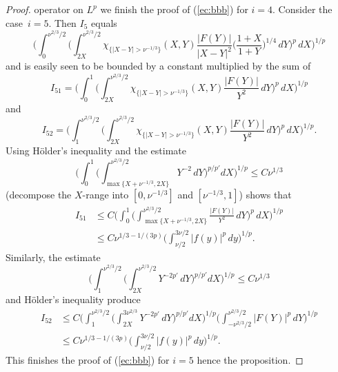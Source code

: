 \documentclass[leqno,a4paper]{amsart}
\begin{document}
\begin{proof}
operator on $L^p$ we finish the proof of (\ref{ec:bbb}) for $i=4$.
Consider the case~$i=5$. Then $I_5$ equals
\begin{equation*}
\bigg( \int_{0}^{\nu^{2/3}/2}\bigg(\int_{2X}^{\nu^{2/3}/2}
\chi_{\{|X-Y|>\nu^{-1/3}\}}(X,Y)\frac{|F(Y)|}{|X-Y|^2}
\bigg(\frac{1+X}{1+Y}\bigg)^{1/4}\,dY\bigg)^p \,dX\bigg)^{1/p}
\end{equation*}
and is easily seen to be bounded by a constant multiplied by the sum of
\begin{equation*}
I_{51}=\bigg(\int_{0}^{1}\bigg(\int_{2X}^{\nu^{2/3}/2}
\chi_{\{|X-Y|>\nu^{-1/3}\}}(X,Y)\frac{|F(Y)|}{Y^{2}}\,dY\bigg)^p\,dX\bigg)^{1/p}
\end{equation*}
and
\begin{equation*}
I_{52}=\bigg(\int_{1}^{\nu^{2/3}/2}\bigg(\int_{2X}^{\nu^{2/3}/2}
\chi_{\{|X-Y|>\nu^{-1/3}\}}(X,Y)\frac{|F(Y)|}{Y^{2}}\,dY\bigg)^p\,dX\bigg)^{1/p}.
\end{equation*}
Using H\"older's inequality and the estimate
\begin{equation*}
\bigg(\int_{0}^{1}\bigg(\int_{\max\{X+\nu^{-1/3},2X\}}^{\nu^{2/3}/2}Y^{-2}
\,dY\bigg)^{p/p'}dX\bigg)^{1/p}\le C \nu^{1/3}
\end{equation*}
(decompose the $X$-range into $[0,\nu^{-1/3}]$ and $[\nu^{-1/3},1]$) shows
that
\begin{align*}
I_{51}&\le C \bigg(\int_{0}^{1}\bigg(\int_{\max\{X+\nu^{-1/3},2X\}}
^{\nu^{2/3}/2}\frac{|F(Y)|}{Y^{2}}\,dY\bigg)^p\,dX\bigg)^{1/p}\\
&\le C\nu^{1/3-1/(3p)}\bigg(\int_{\nu/2}^{3\nu/2}|f(y)|^p\,dy\bigg)^{1/p}.
\end{align*}
Similarly, the estimate
\begin{equation*}
\bigg(\int_{1}^{\nu^{2/3}/2}\bigg(\int_{2X}^{\nu^{2/3}/2}
Y^{-2p'}\,dY\bigg)^{p/p'}dX\bigg)^{1/p}\le C\nu^{1/3}
\end{equation*}
and H\"older's inequality produce
\begin{align*}
I_{52}&\le C\bigg(\int_{1}^{\nu^{2/3}/2}
\bigg(\int_{2X}^{3\nu^{2/3}}Y^{-2p'}\,dY\bigg)^{p/p'}dX\bigg)^{1/p}
\bigg(\int_{-\nu^{2/3}/2}^{\nu^{2/3}/2}|F(Y)|^p\,dY\bigg)^{1/p}\\
&\le C\nu^{1/3-1/(3p)}\bigg(\int_{\nu/2}^{3\nu/2}|f(y)|^p\,dy\bigg)^{1/p}.
\end{align*}
This finishes the proof of (\ref{ec:bbb}) for $i=5$ hence the proposition.
\end{proof}
\end{document}
